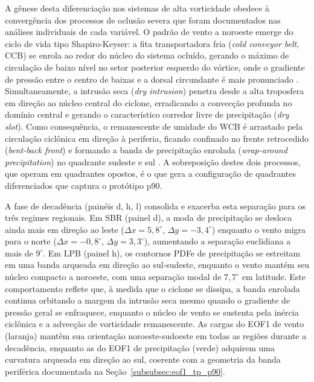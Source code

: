 A gênese desta diferenciação nos sistemas de alta vorticidade obedece à convergência dos processos de oclusão severa que foram documentados nas análises individuais de cada variável. O padrão de vento a noroeste emerge do ciclo de vida tipo Shapiro-Keyser: a fita transportadora fria (\textit{cold conveyor belt}, CCB) se enrola ao redor do núcleo do sistema ocluído, gerando o máximo de circulação de baixo nível no setor posterior esquerdo do vórtice, onde o gradiente de pressão entre o centro de baixas e a dorsal circundante é mais pronunciado \citep{schultz2021antecedents}. Simultaneamente, a intrusão seca (\textit{dry intrusion}) penetra desde a alta troposfera em direção ao núcleo central do ciclone, erradicando a convecção profunda no domínio central e gerando o característico corredor livre de precipitação (\textit{dry slot}). Como consequência, o remanescente de umidade do WCB é arrastado pela circulação ciclônica em direção à periferia, ficando confinado no frente retrocedido (\textit{bent-back front}) e formando a banda de precipitação enrolada (\textit{wrap-around precipitation}) no quadrante sudeste e sul \citep{shapiro1990life}. A sobreposição destes dois processos, que operam em quadrantes opostos, é o que gera a configuração de quadrantes diferenciados que captura o protótipo p90.

A fase de decadência (painéis d, h, l) consolida e exacerba esta separação para os três regimes regionais. Em SBR (painel d), a moda de precipitação se desloca ainda mais em direção ao leste ($\Delta x = 5{,}8^{\circ}$, $\Delta y = -3{,}4^{\circ}$) enquanto o vento migra para o norte ($\Delta x = -0{,}8^{\circ}$, $\Delta y = 3{,}3^{\circ}$), aumentando a separação euclidiana a mais de $9^{\circ}$. Em LPB (painel h), os contornos PDFe de precipitação se estreitam em uma banda arqueada em direção ao sul-sudeste, enquanto o vento mantém seu núcleo compacto a noroeste, com uma separação modal de $7{,}7^{\circ}$ em latitude. Este comportamento reflete que, à medida que o ciclone se dissipa, a banda enrolada continua orbitando a margem da intrusão seca mesmo quando o gradiente de pressão geral se enfraquece, enquanto o núcleo de vento se sustenta pela inércia ciclônica e a advecção de vorticidade remanescente. As cargas do EOF1 de vento (laranja) mantêm sua orientação noroeste-sudoeste em todas as regiões durante a decadência, enquanto as do EOF1 de precipitação (verde) adquirem uma curvatura arqueada em direção ao sul, coerente com a geometria da banda periférica documentada na Seção~\ref{subsubsec:eof1_tp_p90}.

